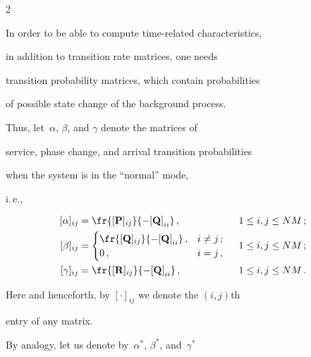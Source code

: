 \begin{multicols}{2}
\begin{itemize}
\end{itemize}





In order to be able to compute time-related characteristics,


in addition to transition rate matrices, one needs


transition probability matrices, which contain probabilities 


of possible state change of the background process.


Thus, let~$\alpha$, $\beta$, and $\gamma$ denote the matrices of


service, phase change, and arrival transition probabilities


when the system is in the ``normal'' mode,


i.\,e.,


\begin{alignat*}{3}


[\alpha]_{ij}  


&=


\fr{[\bmx{P}]_{ij} }{-{[\bmx{Q}]}_{ii}}\,, &\enskip 1 &\le i, j \le NM\,;


\\


[\beta]_{ij}  


&=\begin{cases}


\fr{[\bmx{Q}]_{ij}}{-{[\bmx{Q}]}_{ii}}\,,  & i \neq j\,; \\


0\,, & i = j\,,


\end{cases}


&\enskip 1 &\le i,j \le NM\,;


\\


[\gamma]_{ij}  


&=\fr{[\bmx{R}]_{ij} }{-{[\bmx{Q}]}_{ii}}\,, &\enskip 1 &\le i,j \le NM\,.


\end{alignat*}





\noindent


Here and henceforth, by $[\cdot]_{ij}$ we denote the $(i,j)${th}


 entry of any matrix.


By analogy, let us denote by~$\alpha^*$, $\beta^*$, and~$\gamma^*$



\end{multicols}
